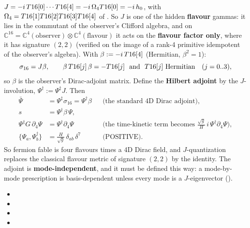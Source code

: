 $J=-i\,T16[0]\cdots T16[4]=-i\,\Omega_4T16[0]=-i\,h_0$, with
$\Omega_4=T16[1]T16[2]T16[3]T16[4]$ of . So $J$ is one of the hidden
\textbf{flavour} gammas: it lies in the commutant of the observer's Clifford algebra, and on
$\mathbb C^{16}=\mathbb C^4(\text{observer})\otimes\mathbb C^4(\text{flavour})$ it acts on the
\textbf{flavour factor only}, where it has signature $(2,2)$ (verified on the image of a rank-4
primitive idempotent of the observer's algebra). With $\beta:=-i\,T16[4]$ (Hermitian,
$\beta^2=1$):
\[
  \sigma_{16}=J\beta,\qquad \beta\,\Tsix{j}\,\beta=-\Tsix{j}\ \text{ and }\ \Tsix{j}\ \text{Hermitian}\quad(j=0..3),
\]
so $\beta$ is the observer's Dirac-adjoint matrix. Define the \textbf{Hilbert adjoint} by the
$J$-involution, $\Psi^{\dagger}:=\Psi^{\ddagger}J$. Then
\begin{align*}
  \bar\Psi&=\Psi^{\ddagger}\sigma_{16}=\Psi^{\dagger}\beta &&\text{(the standard 4D Dirac adjoint)},\\
  s&=\Psi^{\dagger}\beta\,\Psi,\\
  \Psi^{\ddagger}G\,\partial_4\Psi&=\Psi^{\dagger}\partial_4\Psi &&\text{(the time-kinetic term becomes } \tfrac{\sqrt g}{H}\,i\,\Psi^{\dagger}\partial_4\Psi\text{)},\\
  \{\Psi_a,\Psi^{\dagger}_b\}&=\frac{H}{\sqrt g}\,\delta_{ab}\,\delta^7 &&\text{(POSITIVE)}.
\end{align*}
So fermion fable is four flavours times a 4D Dirac field, and $J$-quantization replaces the classical
flavour metric of signature $(2,2)$ by the identity. The adjoint is \textbf{mode-independent}, and it
must be defined this way: a mode-by-mode prescription is basis-dependent unless every mode is a
$J$-eigenvector (). 
\begin{itemize}
  \item {}
  \item {}
  \item {}
  \item {}
\end{itemize}

